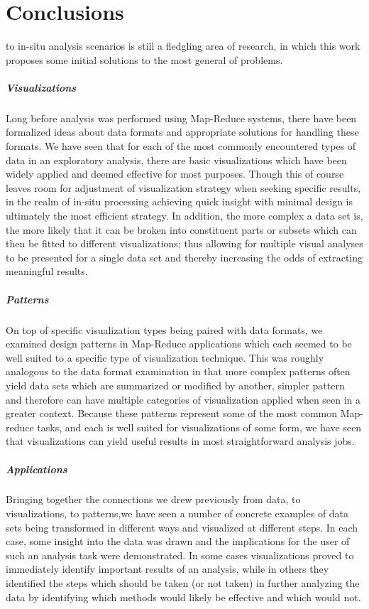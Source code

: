 \chapter{Conclusions}
\label{sec:conclusions}
 to in-situ analysis scenarios is still a fledgling area of research, in which this work proposes some initial solutions to the most general of problems. 

\paragraph{Visualizations}
Long before analysis was performed using Map-Reduce systems, there have been formalized ideas about data formats and appropriate solutions for handling these formats. We have seen that for each of the most commonly encountered types of data in an exploratory analysis, there are basic visualizations which have been widely applied and deemed effective for most purposes. Though this of course leaves room for adjustment of visualization strategy when seeking specific results, in the realm of in-situ processing achieving quick insight with minimal design is ultimately the most efficient strategy. In addition, the more complex a data set is, the more likely that it can be broken into constituent parts or subsets which can then be fitted to different visualizations; thus allowing for multiple visual analyses to be presented for a single data set and thereby increasing the odds of extracting meaningful results. 

\paragraph{Patterns}
On top of specific visualization types being paired with data formats, we examined design patterns in Map-Reduce applications which each seemed to be well suited to a specific type of visualization technique. This was roughly analogous to the data format examination in that more complex patterns often yield data sets which are summarized or modified by another, simpler pattern and therefore can have multiple categories of visualization applied when seen in a greater context. Because these patterns represent some of the most common Map-reduce tasks, and each is well suited for visualizations of some form, we have seen that visualizations can yield useful results in most straightforward analysis jobs.

\paragraph{Applications}
Bringing together the connections we drew previously from data, to visualizations, to patterns,we have seen a number of concrete examples of data sets being transformed in different ways and visualized at different steps. In each case, some insight into the data was drawn and the implications for the user of such an analysis task were demonstrated. In some cases visualizations proved to immediately identify important results of an analysis, while in others they identified the steps which should be taken (or not taken) in further analyzing the data by identifying which methods would likely be effective and which would not.

